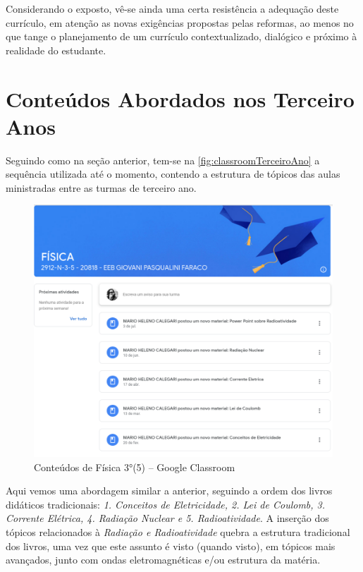 Considerando o exposto, vê-se ainda uma certa resistência a adequação deste currículo, em atenção as novas exigências propostas pelas reformas, ao menos no que tange o planejamento de um currículo contextualizado, dialógico e próximo à realidade do estudante.

\section{Conteúdos Abordados nos Terceiro Anos}
Seguindo como na seção anterior, tem-se na \autoref{fig:classroomTerceiroAno} a sequência utilizada até o momento, contendo a estrutura de tópicos das aulas ministradas entre as turmas de terceiro ano.
\vspace{.5cm} 
\begin{figure}[!ht]
    \begin{center}
        \includegraphics[width=\textwidth]{03-elementos/03.2_textual/03.2.1_fig/programaFisica3-5.png}
        \caption{Conteúdos de Física 3°(5) -- Google Classroom}
        \label{fig:classroomTerceiroAno}
    \end{center}    
\end{figure}

Aqui vemos uma abordagem similar a anterior, seguindo a ordem dos livros didáticos tradicionais: \emph{1. Conceitos de Eletricidade, 2. Lei de Coulomb, 3. Corrente Elétrica, 4. Radiação Nuclear e 5. Radioatividade}. A inserção dos tópicos relacionados à \emph{Radiação e Radioatividade} quebra a estrutura tradicional dos livros, uma vez que este assunto é visto (quando visto), em tópicos mais avançados, junto com ondas eletromagnéticas e/ou estrutura da matéria.


